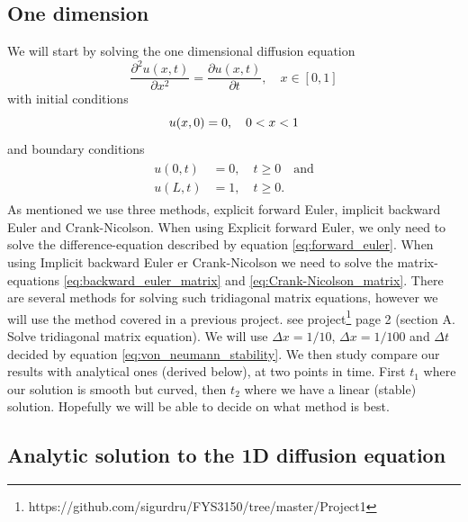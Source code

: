 \documentclass[reprint, english,notitlepage,nofootinbib]{revtex4-1}  %
\begin{document}
\subsection{One dimension}
We will start by solving the one dimensional diffusion equation
\begin{equation*}
  \frac{\partial^2 u(x,t)}{\partial x^2} = \frac{\partial u(x,t)}{\partial t}, \quad x \in [0, 1]
\end{equation*}
with initial conditions
\begin{equation}
	\label{eq:1D_init}
  u(x, 0) = 0, \quad 0<x<1\\
\end{equation}
and boundary conditions
\begin{align}
	\label{eq:1D_bound}
	\begin{split}
  u(0, t) &= 0, \quad t \ge 0 \quad \text{and} \\
  u(L, t) &= 1, \quad t \ge 0.
  \end{split}
\end{align}
As mentioned we use three methods, explicit forward Euler, implicit backward Euler and Crank-Nicolson. When using Explicit forward Euler, we only need to solve the difference-equation described by equation \eqref{eq:forward_euler}. When using Implicit backward Euler er Crank-Nicolson we need to solve the matrix-equations \eqref{eq:backward_euler_matrix} and \eqref{eq:Crank-Nicolson_matrix}. There are several methods for solving such tridiagonal matrix equations, however we will use the method covered in a previous project. see project\footnote{https://github.com/sigurdru/FYS3150/tree/master/Project1} page 2 (section A. Solve tridiagonal matrix equation). We will use $\Delta x = 1/10$, $\Delta x = 1/100$ and $\Delta t$ decided by equation \eqref{eq:von_neumann_stability}. We then study compare our results with analytical ones (derived below), at two points in time. First $t_1$ where our solution is smooth but curved, then $t_2$ where we have a linear (stable) solution. Hopefully we will be able to decide on what method is best.

\subsection*{Analytic solution to the 1D diffusion equation}
\end{document}

